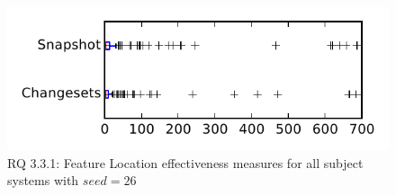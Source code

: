 
\begin{figure}
\centering
\includegraphics[height=0.4\textheight]{figures/flt_seed/rq1_tiny_26}
\caption{RQ 3.3.1: Feature Location effectiveness measures for all subject systems with $seed=26$}
\label{fig:flt_seed:rq1:tiny}
\end{figure}
